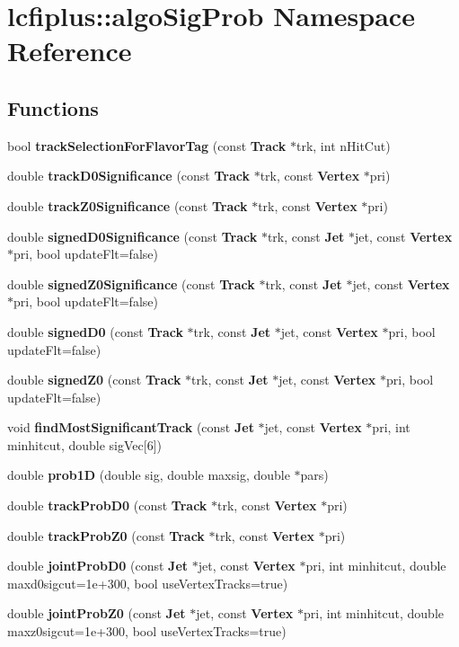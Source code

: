 \section{lcfiplus\-:\-:algo\-Sig\-Prob Namespace Reference}
\label{namespacelcfiplus_1_1algoSigProb}
\subsection*{Functions}
\begin{DoxyCompactItemize}
\item 
bool {\bf track\-Selection\-For\-Flavor\-Tag} (const {\bf Track} $\ast$trk, int n\-Hit\-Cut)
\item 
double {\bf track\-D0\-Significance} (const {\bf Track} $\ast$trk, const {\bf Vertex} $\ast$pri)
\item 
double {\bf track\-Z0\-Significance} (const {\bf Track} $\ast$trk, const {\bf Vertex} $\ast$pri)
\item 
double {\bf signed\-D0\-Significance} (const {\bf Track} $\ast$trk, const {\bf Jet} $\ast$jet, const {\bf Vertex} $\ast$pri, bool update\-Flt=false)
\item 
double {\bf signed\-Z0\-Significance} (const {\bf Track} $\ast$trk, const {\bf Jet} $\ast$jet, const {\bf Vertex} $\ast$pri, bool update\-Flt=false)
\item 
double {\bf signed\-D0} (const {\bf Track} $\ast$trk, const {\bf Jet} $\ast$jet, const {\bf Vertex} $\ast$pri, bool update\-Flt=false)
\item 
double {\bf signed\-Z0} (const {\bf Track} $\ast$trk, const {\bf Jet} $\ast$jet, const {\bf Vertex} $\ast$pri, bool update\-Flt=false)
\item 
void {\bf find\-Most\-Significant\-Track} (const {\bf Jet} $\ast$jet, const {\bf Vertex} $\ast$pri, int minhitcut, double sig\-Vec[6])
\item 
double {\bf prob1\-D} (double sig, double maxsig, double $\ast$pars)
\item 
double {\bf track\-Prob\-D0} (const {\bf Track} $\ast$trk, const {\bf Vertex} $\ast$pri)
\item 
double {\bf track\-Prob\-Z0} (const {\bf Track} $\ast$trk, const {\bf Vertex} $\ast$pri)
\item 
double {\bf joint\-Prob\-D0} (const {\bf Jet} $\ast$jet, const {\bf Vertex} $\ast$pri, int minhitcut, double maxd0sigcut=1e+300, bool use\-Vertex\-Tracks=true)
\item 
double {\bf joint\-Prob\-Z0} (const {\bf Jet} $\ast$jet, const {\bf Vertex} $\ast$pri, int minhitcut, double maxz0sigcut=1e+300, bool use\-Vertex\-Tracks=true)

\end{DoxyCompactItemize}
